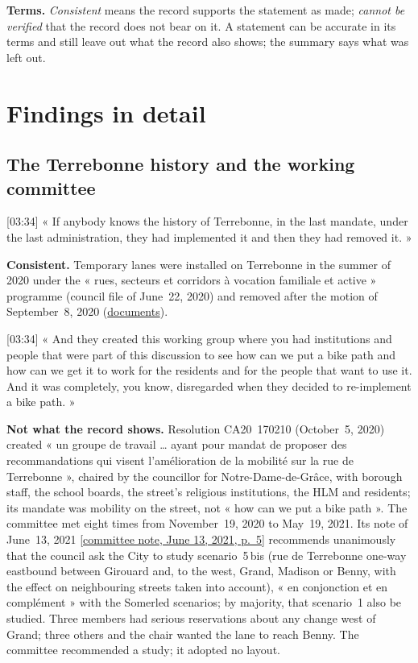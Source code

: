 \documentclass[11pt,letterpaper]{article}
\newcommand{\repourl}{https://github.com/OpenMobilityData/Terrebonne-open-sources}
\newcommand{\doc}[2]{\href{\repourl/blob/main/#1}{#2}}
\newcommand{\cliptime}[1]{\textsf{\small[#1]}}
\newcommand{\wc}[1]{\href{\repourl/blob/main/2020-2021-working-committee/raw/Comite_de_travail_recommandations_2021-06-13.pdf}{\textsf{\small[committee note, June 13, 2021, p.~#1]}}}
\begin{document}
\textbf{Terms.} \emph{Consistent} means the record supports the statement as
made; \emph{cannot be verified} that the record does not bear on it. A
statement can be accurate in its terms and still leave out what the record
also shows; the summary says what was left out.

\section{Findings in detail}

\subsection{The Terrebonne history and the working committee}

\cliptime{03:34} « If anybody knows the history of Terrebonne, in the last
mandate, under the last administration, they had implemented it and then they
had removed it. »

\textbf{Consistent.} Temporary lanes were installed on Terrebonne in the
summer of 2020 under the « rues, secteurs et corridors à vocation familiale
et active » programme (council file of June~22, 2020) and removed after the
motion of September~8, 2020 (\doc{2020-temporary-lanes/}{documents}).

\cliptime{03:34} « And they created this working group where you had
institutions and people that were part of this discussion to see how can we
put a bike path and how can we get it to work for the residents and for the
people that want to use it. And it was completely, you know, disregarded when
they decided to re-implement a bike path. »

\textbf{Not what the record shows.} Resolution CA20~170210 (October~5, 2020)
created « un groupe de travail … ayant pour mandat de proposer des
recommandations qui visent l'amélioration de la mobilité sur la rue de
Terrebonne », chaired by the councillor for Notre-Dame-de-Grâce, with borough
staff, the school boards, the street's religious institutions, the HLM and
residents; its mandate was mobility on the street, not « how can we put a bike
path ». The committee met eight times from November~19, 2020 to May~19, 2021.
Its note of June~13, 2021 \wc{5} recommends unanimously that the council ask
the City to study scenario~5\,bis (rue de Terrebonne one-way eastbound between
Girouard and, to the west, Grand, Madison or Benny, with the effect on
neighbouring streets taken into account), « en conjonction et en complément »
with the Somerled scenarios; by majority, that scenario~1 also be studied.
Three members had serious reservations about any change west of Grand; three
others and the chair wanted the lane to reach Benny. The committee recommended
a study; it adopted no layout.
\end{document}
